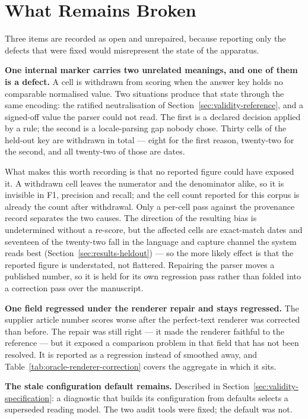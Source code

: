 \section{What Remains Broken}
\label{sec:validity-open}

Three items are recorded as open and unrepaired, because reporting only the defects that
were fixed would misrepresent the state of the apparatus.

\textbf{One internal marker carries two unrelated meanings, and one of them is a defect.} A cell
is withdrawn from scoring when the answer key holds no comparable normalised value. Two
situations produce that state through the same encoding: the ratified neutralisation of
Section~\ref{sec:validity-reference}, and a signed-off value the parser could not read. The first is a
declared decision applied by a rule; the second is a locale-parsing gap nobody chose. Thirty
cells of the held-out key are withdrawn in total --- eight for the first reason, twenty-two for
the second, and all twenty-two of those are dates.

What makes this worth recording is that no reported figure could have exposed it. A withdrawn
cell leaves the numerator and the denominator alike, so it is invisible in \ac{F1}, precision and
recall; and the cell count reported for this corpus is already the count after withdrawal. Only
a per-cell pass against the provenance record separates the two causes. The direction of the
resulting bias is undetermined without a re-score, but the affected cells are exact-match dates
and seventeen of the twenty-two fall in the language and capture channel the system reads best
(Section~\ref{sec:results-heldout}) --- so the more likely effect is that the reported figure is
understated, not flattered. Repairing the parser moves a published number, so it is held for its
own regression pass rather than folded into a correction pass over the manuscript.

\textbf{One field regressed under the renderer repair and stays regressed.} The supplier
article number scores worse after the perfect-text renderer was corrected than before. The
repair was still right --- it made the renderer faithful to the reference --- but it exposed a
comparison problem in that field that has not been resolved. It is reported as a regression
instead of smoothed away, and Table~\ref{tab:oracle-renderer-correction} covers the aggregate
in which it sits.

\textbf{The stale configuration default remains.} Described in
Section~\ref{sec:validity-specification}: a diagnostic that builds its configuration from defaults
selects a superseded reading model. The two audit tools were fixed; the default was not.


